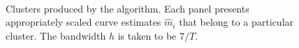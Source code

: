 \documentclass[a4paper,12pt]{article}
\numberwithin{equation}{section}
\begin{document}
\begin{figure}
\\
\hspace{0.25cm}
\caption{Clusters produced by the algorithm. Each panel presents appropriately scaled curve estimates $\hat{m}_i$ that belong to a particular cluster. The bandwidth $h$ is taken to be $7/T$.}\label{fig:clusters_alt_14days}
\end{figure}

\clearpage

{\small
\setlength{\bibsep}{0.35em}
}
\end{document}
